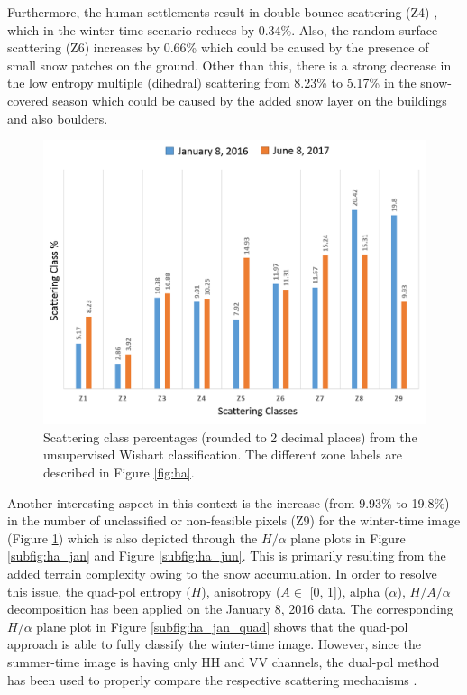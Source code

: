 \documentclass[review]{elsarticle}
\numberwithin{equation}{section}
\numberwithin{figure}{section}
\numberwithin{table}{section}
\begin{document}
Furthermore, the human settlements result in double-bounce scattering (Z4) \citep{Brunner2009}, which in the winter-time scenario reduces by 0.34\%. Also, the random surface scattering (Z6) increases by 0.66\% which could be caused by the presence of small snow patches on the ground. Other than this, there is a strong decrease in the low entropy multiple (dihedral) scattering from 8.23\% to 5.17\% in the snow-covered season which could be caused by the added snow layer on the buildings and also boulders.

\begin{figure}[htb]
    \centering
    \includegraphics[width=\textwidth]{Figures/Results/Percent.png}
    \caption{Scattering class percentages (rounded to 2 decimal places) from the unsupervised Wishart classification.
The different zone labels are described in Figure \ref{fig:ha}.}
    \label{fig:percent}
\end{figure}

Another interesting aspect in this context is the increase (from 9.93\% to 19.8\%) in the number of unclassified or non-feasible pixels (Z9) for the winter-time image (Figure \ref{fig:percent}) which is also depicted through the $H/{\alpha}$ plane plots in Figure \ref{subfig:ha_jan} and Figure \ref{subfig:ha_jun}. This is primarily resulting from the added terrain complexity owing to the snow accumulation. In order to resolve this issue, the quad-pol entropy ($H$), anisotropy ($A \in$ [0, 1]), alpha ($\alpha$), $H/A/{\alpha}$ decomposition has been applied on the January 8, 2016 data. The corresponding $H/{\alpha}$ plane plot in Figure \ref{subfig:ha_jan_quad} shows that the quad-pol approach is able to fully classify the winter-time image. However, since the summer-time image is having only HH and VV channels, the dual-pol method has been used to properly compare the respective scattering mechanisms \citep{Majumdar2019}.
\end{document}
